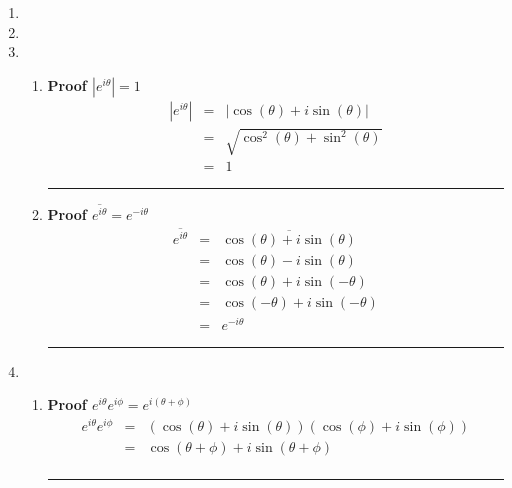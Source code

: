 \documentclass{article}%
\newcommand\abs[1]{\left|#1\right|}
\newenvironment{proof}[1][]{\begin{samepage}\textbf{Proof #1} }{\rule{0.5em}{0.5em} \end{samepage}}
\begin{document}
\begin{enumerate}
\begin{enumerate}[label*=\arabic*.]
\begin{enumerate}[label=\alph*]
        \end{enumerate}
        \item %
        \item %
        \item %
        \begin{enumerate}[label=\alph*]
            \item %
            \begin{proof}[$\abs{e^{i \theta}}=1$]
                \begin{eqnarray*}
                    \abs{e^{i \theta}} &=& \abs{\cos(\theta) + i \sin(\theta)} \\
                                       &=& \sqrt{\cos^2(\theta) + \sin^2(\theta)} \\
                                       &=& 1
                \end{eqnarray*}
            \end{proof}
            \item %
            \begin{proof}[$\overline{e^{i\theta}}=e^{-i\theta}$]
                \begin{eqnarray*}
                    \overline{e^{i\theta}}&=& \overline{\cos(\theta) + i \sin(\theta)} \\
                                          &=& \cos(\theta) - i \sin(\theta) \\
                                          &=& \cos(\theta) + i \sin(-\theta) \\
                                          &=& \cos(-\theta) + i \sin(-\theta) \\
                                          &=& e^{-i\theta}
                \end{eqnarray*}
            \end{proof}
        \end{enumerate}
        \item %
        \begin{enumerate}[label=\alph*]
            \item %
            \begin{proof}[$e^{i\theta}e^{i\phi}=e^{i(\theta+\phi)}$]
                \begin{eqnarray*}
                    e^{i\theta}e^{i\phi} &=& (\cos(\theta) + i\sin(\theta))(\cos(\phi) + i\sin(\phi)) \\
                                         &=& \cos(\theta + \phi) + i\sin(\theta + \phi) \\

\end{eqnarray*}
\end{proof}
\end{enumerate}
\end{enumerate}
\end{enumerate}
\end{document}
